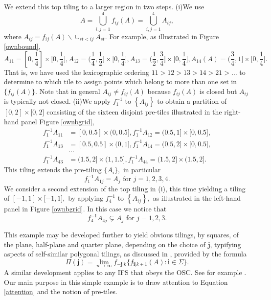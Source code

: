 \documentclass{amsproc}%
\theoremstyle{plain}
\theoremstyle{definition}
\numberwithin{equation}{section}
\begin{document}
We extend this top tiling to a larger region in two steps. (i)We use
\[
A=%
{\textstyle\bigcup_{i,j=1}^{4}}
f_{ij}(A)=%
{\textstyle\bigcup_{i,j=1}^{4}}
A_{ij},
\]
where $A_{ij}=f_{ij}(A)\backslash\cup_{st<ij}A_{st}.$ For example, as
illustrated in Figure \ref{ownbound},%
\[
A_{11}=[0,\frac{1}{4}]\times\lbrack0,\frac{1}{4}],A_{12}=(\frac{1}{4},\frac
{1}{2}]\times\lbrack0,\frac{1}{4}],A_{13}=(\frac{1}{2},\frac{3}{4}%
]\times\lbrack0,\frac{1}{4}],A_{14}(A)=(\frac{3}{4},1]\times\lbrack0,\frac
{1}{4}].
\]
That is, we have used the lexicographic ordering $11>12>13>14>21>\dots$ to
determine to which tile to assign points which belong to more than one set in
$\{f_{ij}(A)\}.$ Note that in general $A_{ij}\neq f_{ij}(A)$ because
$f_{ij}(A)$ is closed but $A_{ij}$ is typically not closed. (ii)We apply
$f_{1}^{-1}$ to $\left\{  A_{ij}\right\}  $ to obtain a partition of
$[0,2]\times\lbrack0,2]$ consisting of the sixteen disjoint pre-tiles
illustrated in the right-hand panel Figure \ref{ownbgrid},
\begin{align*}
f_{1}^{-1}A_{11}  &  =[0,0.5]\times(0,0.5],f_{1}^{-1}A_{12}=(0.5,1]\times
\lbrack0,0.5],\\
f_{1}^{-1}A_{13}  &  =[0.5,0.5]\times(0,1],f_{1}^{-1}A_{14}=(0.5,2]\times
\lbrack0,0.5],\\
&  \dots\\
f_{1}^{-1}A_{43}  &  =(1.5,2]\times(1,1.5],f_{1}^{-1}A_{44}=(1.5,2]\times
(1.5,2].
\end{align*}
This tiling extends the pre-tiling $\{A_{i}\},$ in particular
\[
f_{1}^{-1}A_{1j}=A_{j}\text{ for }j=1,2,3,4.
\]
We consider a second extension of the top tiling in (i), this time yielding a
tiling of $[-1,1]\times\lbrack-1,1],$ by applying $f_{4}^{-1}$ to $\left\{
A_{ij}\right\}  ,$ as illustrated in the left-hand panel in Figure
\ref{ownbgrid}. In this case we notice that%
\begin{equation}
f_{4}^{-1}A_{4j}\subsetneq A_{j}\text{ for }j=1,2,3. \label{attention}%
\end{equation}


This example may be developed further to yield obvious tilings, by squares, of
the plane, half-plane and quarter plane, depending on the choice of
$\mathbf{j}$, typifying aspects of self-similar polygonal tilings, as
discussed in \cite{polygon}, provided by the formula%
\[
\Pi(\mathbf{j})=\lim_{n\rightarrow\infty}f_{-\mathbf{j}|k}\{f_{\mathbf{i}%
|k+1}(A):\mathbf{i\in}\Sigma\}.
\]
A similar development applies to any IFS that obeys the OSC. See for example
\cite{polygon}. Our main purpose in this simple example is to draw attention
to Equation \ref{attention} and the notion of pre-tiles.
\end{document}
